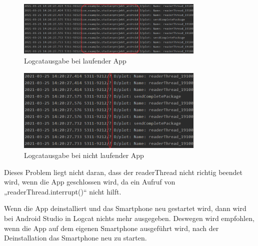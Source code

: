 \documentclass[12pt, onecolumn, notitlepage]{scrartcl}
\begin{document}
\begin{figure}[htbp] 
	\centering
	\includegraphics[width=0.8\textwidth]{Logcat_laufend.PNG}
	\caption{Logcatausgabe bei laufender App}
\end{figure}

\begin{figure}[htbp] 
	\centering
	\includegraphics[width=0.8\textwidth]{Logcat_nichtLaufend.PNG}
	\caption{Logcatausgabe bei nicht laufender App}
\end{figure}

Dieses Problem liegt nicht daran, dass der readerThread nicht richtig beendet wird, wenn die App geschlossen wird, da ein Aufruf von „readerThread.interrupt()“ nicht hilft.\par
Wenn die App deinstalliert und das Smartphone neu gestartet wird, dann wird bei Android Studio in Logcat nichts mehr ausgegeben. Deswegen wird empfohlen, wenn die App auf dem eigenen Smartphone ausgeführt wird, nach der Deinstallation das Smartphone neu zu starten. 
\end{document}
